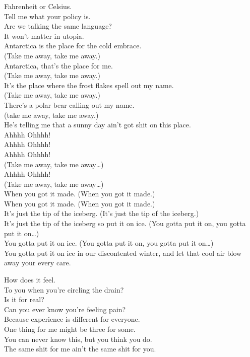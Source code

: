 Fahrenheit or Celsius. \\
Tell me what your policy is. \\
Are we talking the same language? \\
It won't matter in utopia. \\
Antarctica is the place for the cold embrace. \\

(Take me away, take me away.) \\
Antarctica, that's the place for me. \\
(Take me away, take me away.) \\
It's the place where the frost flakes spell out my name. \\
(Take me away, take me away.) \\
There's a polar bear calling out my name. \\
(take me away, take me away.) \\
He's telling me that a sunny day ain't got shit on this place. \\

Ahhhh Ohhhh! \\
Ahhhh Ohhhh! \\
Ahhhh Ohhhh! \\
(Take me away, take me away…) \\
Ahhhh Ohhhh! \\
(Take me away, take me away…) \\

When you got it made. (When you got it made.) \\
When you got it made. (When you got it made.) \\
It's just the tip of the iceberg. (It's just the tip of the iceberg.) \\
It's just the tip of the iceberg so put it on ice. (You gotta put it on, you gotta put it on…) \\
You gotta put it on ice. (You gotta put it on, you gotta put it on…) \\
You gotta put it on ice in our discontented winter, and let that cool air blow away your every care. \\



How does it feel. \\
To you when you're circling the drain? \\
Is it for real? \\
Can you ever know you're feeling pain? \\
Because experience is different for everyone. \\
One thing for me might be three for some. \\
You can never know this, but you think you do. \\
The same shit for me ain't the same shit for you. \\

